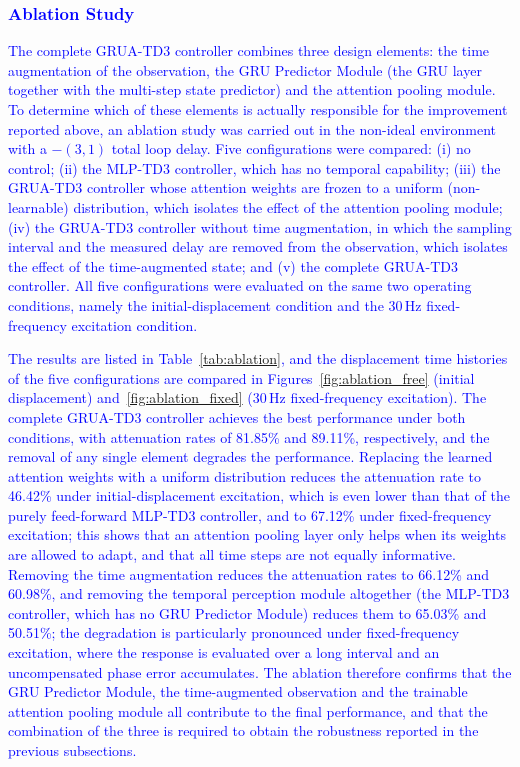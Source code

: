 \documentclass[review]{elsarticle}
\begin{document}
\subsubsection{\textcolor{blue}{Ablation Study}}

\textcolor{blue}{The complete GRUA-TD3 controller combines three design elements: the time augmentation of the observation, the GRU Predictor Module (the GRU layer together with the multi-step state predictor) and the attention pooling module. To determine which of these elements is actually responsible for the improvement reported above, an ablation study was carried out in the non-ideal environment with a $-(3,1)$ total loop delay. Five configurations were compared: (i) no control; (ii) the MLP-TD3 controller, which has no temporal capability; (iii) the GRUA-TD3 controller whose attention weights are frozen to a uniform (non-learnable) distribution, which isolates the effect of the attention pooling module; (iv) the GRUA-TD3 controller without time augmentation, in which the sampling interval and the measured delay are removed from the observation, which isolates the effect of the time-augmented state; and (v) the complete GRUA-TD3 controller. All five configurations were evaluated on the same two operating conditions, namely the initial-displacement condition and the 30\,Hz fixed-frequency excitation condition.}

\textcolor{blue}{The results are listed in Table~\ref{tab:ablation}, and the displacement time histories of the five configurations are compared in Figures~\ref{fig:ablation_free} (initial displacement) and~\ref{fig:ablation_fixed} (30\,Hz fixed-frequency excitation). The complete GRUA-TD3 controller achieves the best performance under both conditions, with attenuation rates of 81.85\% and 89.11\%, respectively, and the removal of any single element degrades the performance. Replacing the learned attention weights with a uniform distribution reduces the attenuation rate to 46.42\% under initial-displacement excitation, which is even lower than that of the purely feed-forward MLP-TD3 controller, and to 67.12\% under fixed-frequency excitation; this shows that an attention pooling layer only helps when its weights are allowed to adapt, and that all time steps are not equally informative. Removing the time augmentation reduces the attenuation rates to 66.12\% and 60.98\%, and removing the temporal perception module altogether (the MLP-TD3 controller, which has no GRU Predictor Module) reduces them to 65.03\% and 50.51\%; the degradation is particularly pronounced under fixed-frequency excitation, where the response is evaluated over a long interval and an uncompensated phase error accumulates. The ablation therefore confirms that the GRU Predictor Module, the time-augmented observation and the trainable attention pooling module all contribute to the final performance, and that the combination of the three is required to obtain the robustness reported in the previous subsections.}
\end{document}

